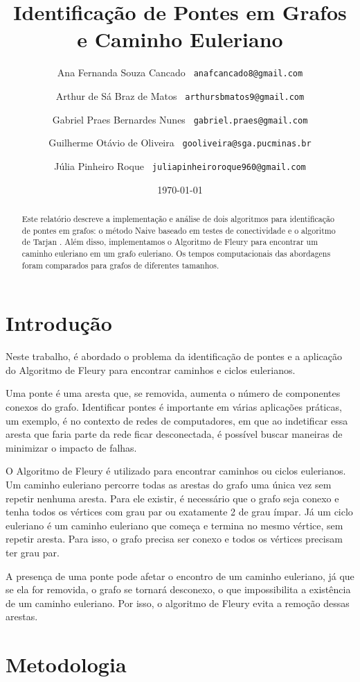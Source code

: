 \documentclass{article}
\title{Identifica\c{c}\~ao de Pontes em Grafos e Caminho Euleriano}
\author{
    Ana Fernanda Souza Cancado \|\texttt{ anafcancado8@gmail.com} \and
    Arthur de S\'a Braz de Matos \|\texttt{ arthursbmatos9@gmail.com} \and
    Gabriel Praes Bernardes Nunes \|\texttt{ gabriel.praes@gmail.com} \and
    Guilherme Ot\'avio de Oliveira \|\texttt{ gooliveira@sga.pucminas.br} \and
    J\'ulia Pinheiro Roque \|\texttt{ juliapinheiroroque960@gmail.com}
}
\affil{PUC Minas}
\date{\today}
\begin{document}
\maketitle

\renewcommand{\abstractname}{Resumo}
\begin{abstract}
Este relatório descreve a implementação e análise de dois algoritmos para identificação de pontes em grafos: o método Naive \cite{SHARIR198167} baseado em testes de conectividade e o algoritmo de Tarjan \cite{doi:10.1137/0201010}. Além disso, implementamos o Algoritmo de Fleury \cite{10.5555/1051910} para encontrar um caminho euleriano em um grafo euleriano. Os tempos computacionais das abordagens foram comparados para grafos de diferentes tamanhos.
\end{abstract}

\section{Introdução}
 Neste trabalho, é abordado o problema da identificação de pontes e a aplicação do Algoritmo de Fleury para encontrar caminhos e ciclos eulerianos. 

Uma ponte é uma aresta que, se removida, aumenta o número de componentes conexos do grafo. Identificar pontes é importante em várias aplicações práticas, um exemplo, é no contexto de redes de computadores, em que ao indetificar essa aresta que faria parte da rede ficar desconectada, é possível buscar maneiras de minimizar o impacto de falhas.

O Algoritmo de Fleury é utilizado para encontrar caminhos ou ciclos eulerianos. Um caminho euleriano percorre todas as arestas do grafo uma única vez sem repetir nenhuma aresta. Para ele existir, é necessário que o grafo seja conexo e tenha todos os vértices com grau par ou exatamente 2 de grau ímpar. Já um ciclo euleriano é um caminho euleriano que começa e termina no mesmo vértice, sem repetir aresta. Para isso, o grafo precisa ser conexo e todos os vértices precisam ter grau par. 

A presença de uma ponte pode afetar o encontro de um caminho euleriano, já que se ela for removida, o grafo se tornará desconexo, o que impossibilita a existência de um caminho euleriano. Por isso, o algoritmo de Fleury evita a remoção dessas arestas.

\section{Metodologia}
\end{document}
